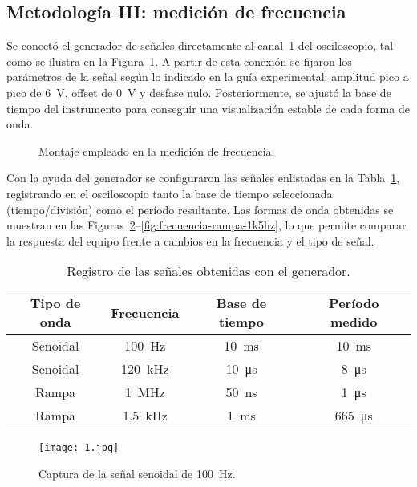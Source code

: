 \documentclass[conference]{IEEEtran} %
\begin{document}
\subsection{Metodología III: medición de frecuencia}
Se conectó el generador de señales directamente al canal~1 del osciloscopio, tal como se ilustra en la Figura~\ref{fig:montaje-frecuencia}. A partir de esta conexión se fijaron los parámetros de la señal según lo indicado en la guía experimental: amplitud pico a pico de \SI{6}{\volt}, offset de \SI{0}{\volt} y desfase nulo. Posteriormente, se ajustó la base de tiempo del instrumento para conseguir una visualización estable de cada forma de onda.
\begin{figure}[H]
    \centering
    \framebox[0.75\linewidth]{\rule{0pt}{3.5cm}}
    \caption{Montaje empleado en la medición de frecuencia.}
    \label{fig:montaje-frecuencia}
\end{figure}
Con la ayuda del generador se configuraron las señales enlistadas en la Tabla~\ref{tab:frecuencia}, registrando en el osciloscopio tanto la base de tiempo seleccionada (tiempo/división) como el período resultante. Las formas de onda obtenidas se muestran en las Figuras~\ref{fig:frecuencia-senoidal-100hz}--\ref{fig:frecuencia-rampa-1k5hz}, lo que permite comparar la respuesta del equipo frente a cambios en la frecuencia y el tipo de señal.%
\begin{table}[H]
    \centering
    \caption{Registro de las señales obtenidas con el generador.}
    \label{tab:frecuencia}
    \begin{tabular}{|c|c|c|c|}
        \hline
        Tipo de onda & Frecuencia & Base de tiempo & Período medido \\ \hline
        Senoidal & \SI{100}{\hertz} & \SI{10}{\milli\second} & \SI{10}{\milli\second} \\ \hline
        Senoidal & \SI{120}{\kilo\hertz} & \SI{10}{\micro\second} & \SI{8}{\micro\second} \\ \hline
        Rampa & \SI{1}{\mega\hertz} & \SI{50}{\nano\second} & \SI{1}{\micro\second} \\ \hline
        Rampa & \SI{1.5}{\kilo\hertz} & \SI{1}{\milli\second} & \SI{665}{\micro\second} \\ \hline
    \end{tabular}
\end{table}%
\begin{figure}[H]
    \centering
    \texttt{[image: 1.jpg]}
    \caption{Captura de la señal senoidal de \SI{100}{\hertz}.}
    \label{fig:frecuencia-senoidal-100hz}
\end{figure}
\end{document}
